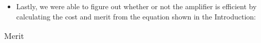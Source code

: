 \begin{itemize}
	\item Lastly, we were able to figure out whether or not the amplifier is efficient by calculating the cost and merit from the equation shown in the Introduction:
\end{itemize}

\begin{table}[H]
  \centering
  \begin{tabular}{|c|c|}
    \hline    
    
  \end{tabular}
  \caption{Merit}
  \label{sim1}
\end{table}
